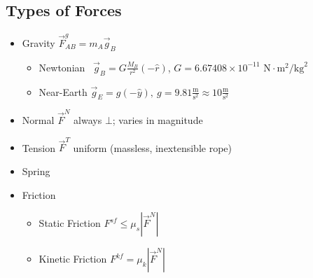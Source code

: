 \documentclass[]{article}
\begin{document}
\newpage
\begin{TeacherMargin}

\end{TeacherMargin}
\begin{PresentSpace}
\vspace{-10pt}
\section*{Types of Forces}
\vspace{-10pt}
\begin{itemize}
	\item Gravity \qquad \qquad \qquad \qquad $\vec{F}^{g}_{AB} = m_{A}\vec{g}_{B}$
	\begin{itemize}
		\item Newtonian \qquad\ $\vec{g}_{B} = G\frac{M_{B}}{r^{2}}(-\hat{r})$, $G = 6.67408\times10^{-11}\text{ N}\cdot\text{m}^{2}/\text{kg}^{2}$
		\item Near-Earth \qquad $\vec{g}_{E} = g(-\hat{y}),\ g=9.81\frac{\text{m}}{\text{s}^{2}} \approx 10\frac{\text{m}}{\text{s}^{2}}$
	\end{itemize}
	\item Normal \qquad $\vec{F}^{N}$ always $\bot$; varies in magnitude
	\item Tension \qquad $\vec{F}^{T}$ uniform (massless, inextensible rope)
	\item Spring
	\item Friction
	\begin{itemize}
		\item Static Friction \qquad $F^{sf}\leq\mu_{s}|\vec{F}^{N}|$
		\item Kinetic Friction \qquad $F^{kf}=\mu_{k}|\vec{F}^{N}|$
	\end{itemize}
\end{itemize}
\end{PresentSpace}
\newpage
\end{document}
